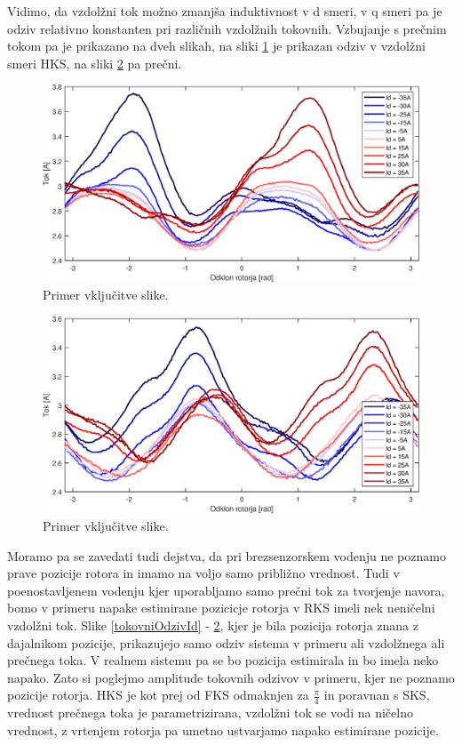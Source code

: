 \documentclass[a4paper,twoside,openright,12pt,slovene]{book}
\begin{document}
Vidimo, da vzdolžni tok možno zmanjša induktivnost v d smeri, v q smeri pa je odziv relativno konstanten pri različnih vzdolžnih tokovnih.
Vzbujanje s prečnim tokom pa je prikazano na dveh slikah, na sliki \ref{tokovniOdzivIq_IdAmp} je prikazan odziv v vzdolžni smeri HKS, na sliki \ref{tokovniOdzivIq_IqAmp} pa prečni. 

\begin{figure}[!htbp]
    \centering
    \includegraphics[width=1\columnwidth]{Slike/tokovniOdzivIq_IdAmp.eps}
    \caption{\label{tokovniOdzivIq_IdAmp} Primer vključitve slike.}
\end{figure}

\begin{figure}[!htbp]
    \centering
    \includegraphics[width=1\columnwidth]{Slike/tokovniOdzivIq_IqAmp.eps}
    \caption{\label{tokovniOdzivIq_IqAmp} Primer vključitve slike.}
\end{figure}
 
Moramo pa se zavedati tudi dejstva, da pri brezsenzorskem vodenju ne poznamo prave pozicije rotora in imamo na voljo samo približno vrednost. Tudi v poenostavljenem vodenju kjer uporabljamo samo
prečni tok za tvorjenje navora, bomo v primeru napake estimirane pozicicje rotorja v RKS imeli nek neničelni vzdolžni tok. Slike \ref{tokovniOdzivId} - \ref{tokovniOdzivIq_IqAmp}, kjer je bila
pozicija rotorja znana z dajalnikom pozicije, prikazujejo samo odziv sistema v primeru ali vzdolžnega ali prečnega toka. V realnem sistemu pa se bo pozicija estimirala in bo imela neko napako. Zato si
poglejmo amplitude tokovnih odzivov v primeru, kjer ne poznamo pozicije rotorja. HKS je kot prej od FKS odmaknjen za $\frac{\pi}{4}$ in poravnan s SKS, vrednost prečnega toka je parametrizirana, vzdolžni tok se vodi na
ničelno vrednost, z vrtenjem rotorja pa umetno ustvarjamo napako estimirane pozicije.
\end{document}

